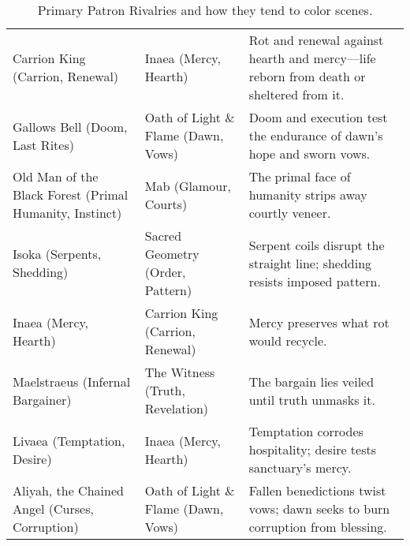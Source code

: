 \begin{table}[h!]
\begin{tabular}{@{}p{3.4cm}p{3.4cm}p{8.2cm}@{}}
    Carrion King (Carrion, Renewal) & Inaea (Mercy, Hearth) & Rot and renewal against hearth and mercy—life reborn from death or sheltered from it. \\
    Gallows Bell (Doom, Last Rites) & Oath of Light \& Flame (Dawn, Vows) & Doom and execution test the endurance of dawn’s hope and sworn vows. \\
    Old Man of the Black Forest (Primal Humanity, Instinct) & Mab (Glamour, Courts) & The primal face of humanity strips away courtly veneer. \\
    Isoka (Serpents, Shedding) & Sacred Geometry (Order, Pattern) & Serpent coils disrupt the straight line; shedding resists imposed pattern. \\
    Inaea (Mercy, Hearth) & Carrion King (Carrion, Renewal) & Mercy preserves what rot would recycle. \\
    Maelstraeus (Infernal Bargainer) & The Witness (Truth, Revelation) & The bargain lies veiled until truth unmasks it. \\
    Livaea (Temptation, Desire) & Inaea (Mercy, Hearth) & Temptation corrodes hospitality; desire tests sanctuary’s mercy. \\
    Aliyah, the Chained Angel (Curses, Corruption) & Oath of Light \& Flame (Dawn, Vows) & Fallen benedictions twist vows; dawn seeks to burn corruption from blessing. \\
    \bottomrule
  \end{tabular}
  \caption{Primary Patron Rivalries and how they tend to color scenes.}
\end{table}
